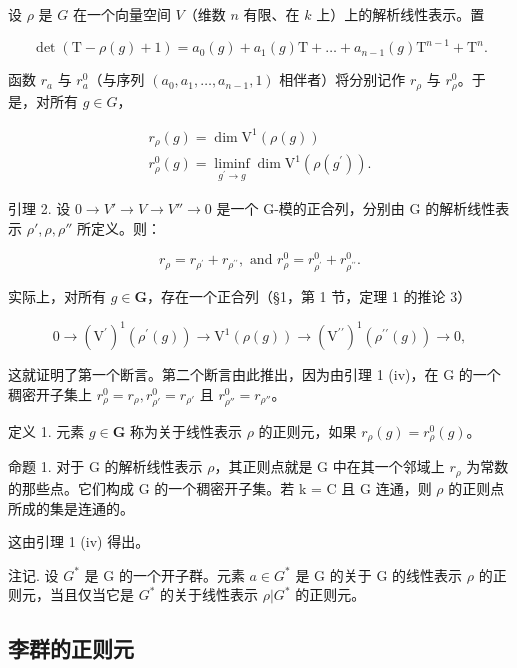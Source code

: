 设 \(\rho\) 是 \(G\) 在一个向量空间 \(V\)（维数 \(n\) 有限、在 \(k\) 上）上的解析线性表示。置

\[
\det (\mathrm{T} - \rho (g) + 1) = a _ {0} (g) + a _ {1} (g) \mathrm{T} + \dots + a _ {n - 1} (g) \mathrm{T} ^ {n - 1} + \mathrm{T} ^ {n}.
\]

函数 \(r_a\) 与 \(r_a^0\)（与序列 \((a_0, a_1, \ldots, a_{n-1}, 1)\) 相伴者）将分别记作 \(r_\rho\) 与 \(r_\rho^0\)。于是，对所有 \(g \in G\)，

\[
\begin{array}{l} r _ {\rho} (g) = \dim \mathrm{V} ^ {1} (\rho (g)) \\ r _ {\rho} ^ {0} (g) = \liminf _ {g ^ {\prime} \to g} \dim \mathrm{V} ^ {1} (\rho (g ^ {\prime})). \end{array}
\]

引理 2. 设 \(0 \to V' \to V \to V'' \to 0\) 是一个 G-模的正合列，分别由 G 的解析线性表示 \(\rho', \rho, \rho''\) 所定义。则：

\[
r _ {\rho} = r _ {\rho^ {\prime}} + r _ {\rho^ {\prime \prime}}, \text { and } r _ {\rho} ^ {0} = r _ {\rho^ {\prime}} ^ {0} + r _ {\rho^ {\prime \prime}} ^ {0}.
\]

实际上，对所有 \(g \in \mathbf{G}\)，存在一个正合列（§1，第 1 节，定理 1 的推论 3）

\[
0 \to (\mathrm{V} ^ {\prime}) ^ {1} (\rho^ {\prime} (g)) \to \mathrm{V} ^ {1} (\rho (g)) \to (\mathrm{V} ^ {\prime \prime}) ^ {1} (\rho^ {\prime \prime} (g)) \to 0,
\]

这就证明了第一个断言。第二个断言由此推出，因为由引理 1 (iv)，在 G 的一个稠密开子集上 \(r_{\rho}^{0} = r_{\rho}, r_{\rho'}^{0} = r_{\rho'}\) 且 \(r_{\rho''}^{0} = r_{\rho''}\)。

定义 1. 元素 \(g \in \mathbf{G}\) 称为关于线性表示 \(\rho\) 的正则元，如果 \(r_{\rho}(g) = r_{\rho}^{0}(g)\)。

命题 1. 对于 G 的解析线性表示 \(\rho\)，其正则点就是 G 中在其一个邻域上 \(r_{\rho}\) 为常数的那些点。它们构成 G 的一个稠密开子集。若 k = C 且 G 连通，则 \(\rho\) 的正则点所成的集是连通的。

这由引理 1 (iv) 得出。

注记. 设 \(G^{*}\) 是 G 的一个开子群。元素 \(a \in G^{*}\) 是 G 的关于 G 的线性表示 \(\rho\) 的正则元，当且仅当它是 \(G^{*}\) 的关于线性表示 \(\rho|G^{*}\) 的正则元。

\subsection{李群的正则元}

